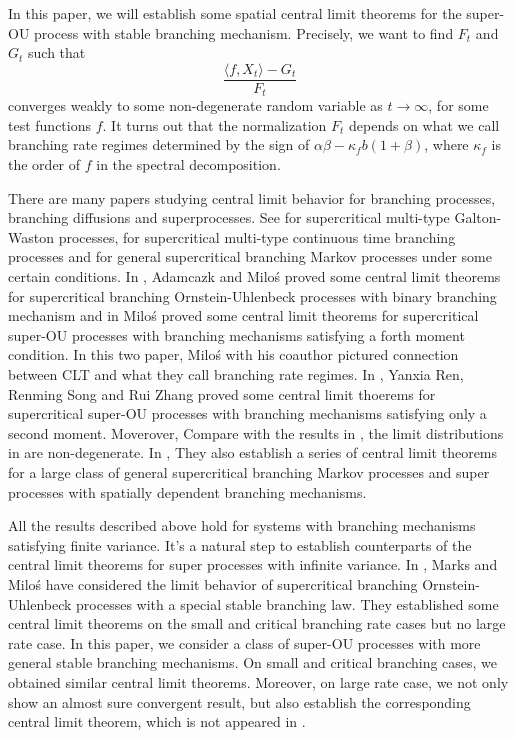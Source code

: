 \documentclass[12pt,a4paper]{amsart}
\theoremstyle{plain}
\theoremstyle{definition}
\numberwithin{equation}{section}
\begin{document}
 In this paper, we will establish some spatial central limit theorems for the super-OU process with stable branching mechanism. Precisely, we want to find $F_t$ and $G_t$ such that
 $$\frac{\langle f, X_t \rangle -G_t}{F_t}$$ converges weakly to some non-degenerate random variable as $t\rightarrow\infty$, for some test functions $f$. It turns out that the normalization $F_t$ depends on what we call branching rate regimes determined by the sign of $\alpha\beta-\kappa_f b (1+\beta)$, where $\kappa_f$ is the order of $f$ in the spectral decomposition.

 There are many papers studying central limit behavior for branching processes, branching diffusions and superprocesses. See \cite{HKBPS1,HKBPS2} for supercritical multi-type Galton-Waston processes, \cite{KBA1,KBA2,KBA3} for supercritical multi-type continuous time branching processes and \cite{ASHH} for general supercritical branching Markov processes under some certain conditions. In \cite{ARMP}, Adamcazk and Milo\'s proved some central limit theorems for supercritical branching Ornstein-Uhlenbeck processes with binary branching mechanism and in \cite{MP2012} Milo\'s proved some central limit theorems for supercritical super-OU processes with branching mechanisms satisfying a forth moment condition. In this two paper, Milo\'s with his coauthor pictured connection between CLT and what they call branching rate regimes. In \cite{RSZ}, Yanxia Ren, Renming Song and Rui Zhang proved some central limit thoerems for supercritical super-OU processes with branching mechanisms satisfying only a second moment. Moverover, Compare with the results in \cite{ARMP,MP2012}, the limit distributions in \cite{RSZ} are non-degenerate. In \cite{RSZ1,RSZ2,RSZ3,RSZ4}, They also establish a series of central limit theorems for a large class of general supercritical branching Markov processes and super processes with spatially dependent branching mechanisms.

 All the results described above hold for systems with branching mechanisms satisfying finite variance. It's a natural step to establish counterparts of the central limit theorems for super processes with infinite variance.  In \cite{MM}, Marks and Milo\'s have considered the limit behavior of supercritical branching Ornstein-Uhlenbeck processes with a special stable branching law. They established some central limit theorems on the small and critical branching rate cases but no large rate case. In this paper, we consider a class of super-OU processes with more general stable branching mechanisms. On small and critical branching cases, we obtained similar central limit theorems. Moreover, on large rate case, we not only show an almost sure convergent result, but also establish the corresponding central limit theorem, which is not appeared in \cite{MM}.
\end{document}

